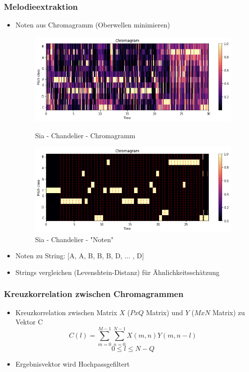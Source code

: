 \documentclass[12pt]{FSUBeamer_official}
\begin{document}
\begin{frame}
	\frametitle{Melodieextraktion}
	\begin{itemize}
		\item Noten aus Chromagramm (Oberwellen minimieren)
		\begin{figure}[ht]
			\begin{minipage}[b]{0.45\linewidth}
				\centering
				\includegraphics[width=\textwidth]{pics/Chroma/sia.png}
				\caption{Sia - Chandelier - Chromagramm}
				\label{sia}
			\end{minipage}
			\hspace{0.5cm}
			\begin{minipage}[b]{0.45\linewidth}
				\centering
				\includegraphics[width=\textwidth]{pics/Chroma/siafiltered.png}
				\caption{Sia - Chandelier - "Noten"}
				\label{siaf}
			\end{minipage}
		\end{figure}
		\item Noten zu String: [A, A, B, B, B, D, ... , D]
		\item Strings vergleichen (Levenshtein-Distanz) für Ähnlichkeitsschätzung 
	\end{itemize}
\end{frame}

\begin{frame}
	\frametitle{Kreuzkorrelation zwischen Chromagrammen}
	\begin{itemize}
		\item Kreuzkorrelation zwischen Matrix $X$ ($PxQ$ Matrix) und $Y$ ($MxN$ Matrix) zu Vektor C
			\begin{equation} \label{eq:conv1}
				C(l) = \sum_{m = 0}^{M - 1}{\sum_{n = 0}^{N - 1}{X(m, n)Y(m, n - l)}}
			\end{equation}
			\begin{equation} \label{eq:conv2}
				0 \leq l \leq N - Q
			\end{equation}
		\item Ergebnisvektor wird Hochpassgefiltert
	\end{itemize}
\end{frame}
\end{document}
